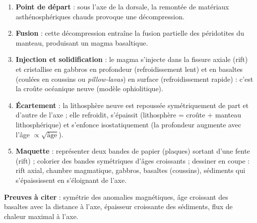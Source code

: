 \documentclass[11pt]{article}
\newcommand{\cle}[1]{{\popxbold\color{popdark}#1}}
\begin{document}
\begin{methode}
\begin{enumerate}
\item \textbf{Point de départ} : sous l'axe de la dorsale, la remontée de matériaux asthénosphériques chauds provoque une \cle{décompression}.
\item \textbf{Fusion} : cette décompression entraîne la fusion partielle des péridotites du manteau, produisant un magma basaltique.
\item \textbf{Injection et solidification} : le magma s'injecte dans la fissure axiale (rift) et cristallise en \cle{gabbros} en profondeur (refroidissement lent) et en \cle{basaltes} (coulées en coussins ou \emph{pillow-lavas}) en surface (refroidissement rapide) : c'est la croûte océanique neuve (modèle ophiolitique).
\item \textbf{Écartement} : la lithosphère neuve est repoussée symétriquement de part et d'autre de l'axe ; elle refroidit, s'épaissit (lithosphère = croûte + manteau lithosphérique) et s'enfonce isostatiquement (la profondeur augmente avec l'âge $\propto \sqrt{\text{âge}}$).
\item \textbf{Maquette} : représenter deux bandes de papier (plaques) sortant d'une fente (rift) ; colorier des bandes symétriques d'âges croissants ; dessiner en coupe : rift axial, chambre magmatique, gabbros, basaltes (coussins), sédiments qui s'épaississent en s'éloignant de l'axe.
\end{enumerate}
\textbf{Preuves à citer} : symétrie des anomalies magnétiques, âge croissant des basaltes avec la distance à l'axe, épaisseur croissante des sédiments, flux de chaleur maximal à l'axe.
\end{methode}
\end{document}
